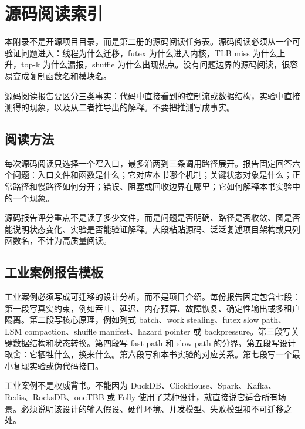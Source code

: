 \chapter{源码阅读索引}

本附录不是开源项目目录，而是第二册的源码阅读任务表。源码阅读必须从一个可验证问题进入：线程为什么迁移，futex 为什么进入内核，TLB miss 为什么上升，top-k 为什么漏报，shuffle 为什么出现热点。没有问题边界的源码阅读，很容易变成复制函数名和模块名。

\begin{keyidea}
源码阅读报告要区分三类事实：代码中直接看到的控制流或数据结构，实验中直接测得的现象，以及从二者推导出的解释。不要把推测写成事实。
\end{keyidea}

\section{阅读方法}

每次源码阅读只选择一个窄入口，最多沿两到三条调用路径展开。报告固定回答六个问题：入口文件和函数是什么；它对应本书哪个机制；关键状态对象是什么；正常路径和慢路径如何分开；错误、阻塞或回收边界在哪里；它如何解释本书实验中的一个现象。

\begin{rubricbox}
源码报告评分重点不是读了多少文件，而是问题是否明确、路径是否收敛、图是否能说明状态变化、实验是否能验证解释。大段粘贴源码、泛泛复述项目架构或只列函数名，不计为高质量阅读。
\end{rubricbox}

\section{工业案例报告模板}

工业案例必须写成可迁移的设计分析，而不是项目介绍。每份报告固定包含七段：第一段写真实约束，例如吞吐、延迟、内存预算、故障恢复、确定性输出或多租户隔离。第二段写核心原理，例如列式 batch、work stealing、futex slow path、LSM compaction、shuffle manifest、hazard pointer 或 backpressure。第三段写关键数据结构和状态转换。第四段写 fast path 和 slow path 的分界。第五段写设计取舍：它牺牲什么，换来什么。第六段写和本书实验的对应关系。第七段写一个最小复现实验或伪代码接口。

\begin{warningbox}
工业案例不是权威背书。不能因为 DuckDB、ClickHouse、Spark、Kafka、Redis、RocksDB、oneTBB 或 Folly 使用了某种设计，就直接说它适合所有场景。必须说明该设计的输入假设、硬件环境、并发模型、失败模型和不可迁移之处。
\end{warningbox}

